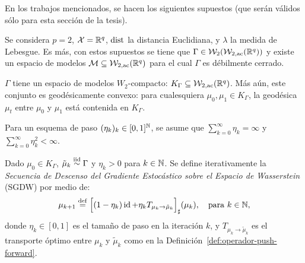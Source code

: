 En los trabajos mencionados, se hacen los siguientes supuestos (que serán válidos sólo para esta sección de la tesis).

\begin{assumption}\label{assump:caso-particular-lebesgue}
    Se considera $p=2$, $\cX = \R^q$, $\dist$ la distancia Euclidiana, y $\lambda$ la medida de Lebesgue. Es más, con estos supuestos se tiene que $\Gamma \in \WassersteinSpace[2]{\WassersteinSpace[2,\mathrm{ac}]{\R^q} } $ y existe un espacio de modelos $\Models \subseteq \WassersteinSpace[2, \mathrm{ac}]{\R^q} $ para el cual $\Gamma$ es débilmente cerrado.
\end{assumption}

\begin{assumption}\label{assump:caso-particular-geodesicamente-convexo}
    $\Gamma$ tiene un espacio de modelos $W_2$-compacto: $K_\Gamma \subseteq \WassersteinSpace[2,\mathrm{ac}]{\R^q} $. Más aún, este conjunto es geodésicamente convexo: para cualesquiera $\mu_0, \mu_1 \in K_\Gamma$, la geodésica $\mu_t$ entre $\mu_0$ y $\mu_1$ está contenida en $K_\Gamma$.
\end{assumption}

\begin{assumption}\label{assump:caso-particular-esquema-paso-L1-L2}
    Para un esquema de paso $(\eta_k)_k \in [0, 1]^\N$, se asume que $\sum_{k=0}^{\infty} \eta_k = \infty$ y $\sum_{k=0}^{\infty} \eta_k^2 < \infty$.
\end{assumption}

\begin{definition}\label{def:sgdw}
    Dado $\mu_0 \in K_\Gamma$, $\tilde \mu_k \simiid \Gamma$ y $\eta_k > 0$ para $k \in\N$. Se define iterativamente la \textit{Secuencia de Descenso del Gradiente Estocástico sobre el Espacio de Wasserstein} (SGDW) por medio de:
    \begin{equation}
        \label{eq:sgdw}
        \mu_{k+1} \eqdef \pf{\qty\Big[
                (1 - \eta_k) \id + \eta_k T_{\mu_k \to \tilde \mu_k}
            ]} (\mu_k), \quad \text{para } k \in\N,
    \end{equation}
    donde $\eta_k \in [0, 1]$ es el tamaño de paso en la iteración $k$, y $T_{\mu_k \to \tilde \mu_k}$ es el transporte óptimo entre $\mu_k$ y $\tilde \mu_k$ como en la Definición~\ref{def:operador-push-forward}.
\end{definition}


